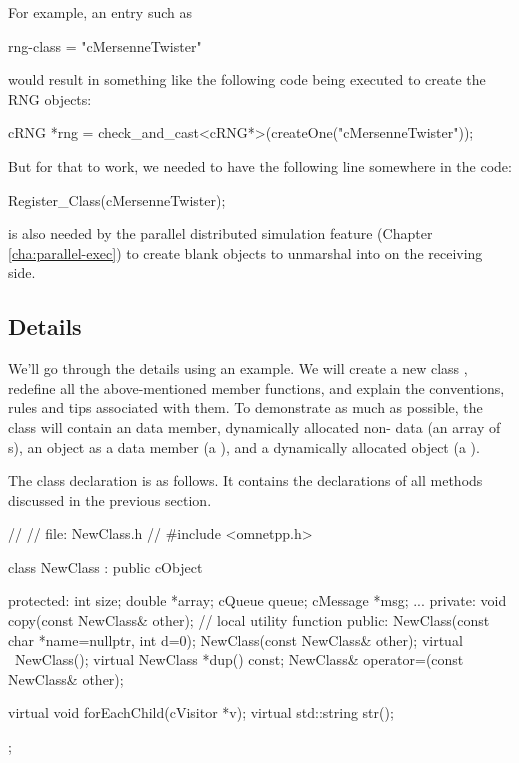 For example, an  entry such as

\begin{inifile}
rng-class = "cMersenneTwister"
\end{inifile}

would result in something like the following code being executed
to create the RNG objects:

\begin{cpp}
cRNG *rng = check_and_cast<cRNG*>(createOne("cMersenneTwister"));
\end{cpp}

But for that to work, we needed to have the following line somewhere in the code:

\begin{cpp}
Register_Class(cMersenneTwister);
\end{cpp}

 is also needed by the parallel distributed simulation feature
(Chapter \ref{cha:parallel-exec}) to create blank objects to unmarshal into
on the receiving side.


\subsection{Details}
\label{sec:sim-lib:subclassing-cobject-details}

We'll go through the details using an example. We will create a new
class , redefine all the above-mentioned 
member functions, and explain the conventions, rules and tips
associated with them.
To demonstrate as much as possible, the class will contain
an  data member, dynamically allocated non- data
(an array of s),
an {\opp} object as a data member (a ), and
a dynamically allocated {\opp} object (a ).

The class declaration is as follows. It contains the declarations
of all methods discussed in the previous section.

\begin{cpp}
//
// file: NewClass.h
//
#include <omnetpp.h>

class NewClass : public cObject
{
  protected:
    int size;
    double *array;
    cQueue queue;
    cMessage *msg;
    ...
  private:
    void copy(const NewClass& other); // local utility function
  public:
    NewClass(const char *name=nullptr, int d=0);
    NewClass(const NewClass& other);
    virtual ~NewClass();
    virtual NewClass *dup() const;
    NewClass& operator=(const NewClass& other);

    virtual void forEachChild(cVisitor *v);
    virtual std::string str();
};
\end{cpp}

